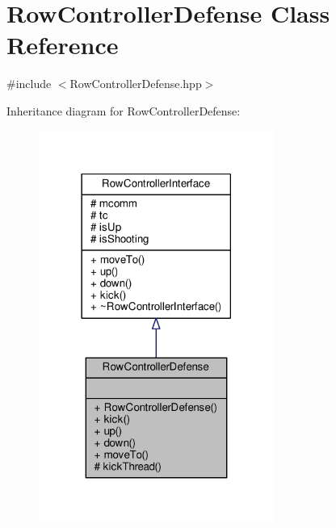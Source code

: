\hypertarget{class_row_controller_defense}{}\section{Row\+Controller\+Defense Class Reference}
\label{class_row_controller_defense}


{\ttfamily \#include $<$Row\+Controller\+Defense.\+hpp$>$}



Inheritance diagram for Row\+Controller\+Defense\+:\nopagebreak
\begin{figure}[H]
\begin{center}
\leavevmode
\includegraphics[width=218pt]{class_row_controller_defense__inherit__graph}
\end{center}
\end{figure}


